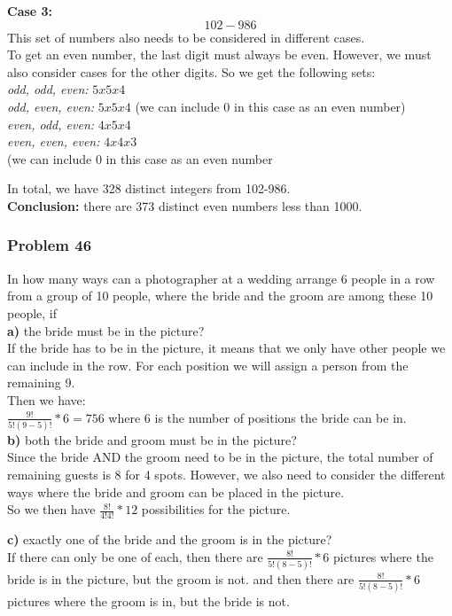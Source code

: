 \documentclass[paper=a4, fontsize=11pt]{scrartcl} %
\begin{document}
\textbf{Case 3:}\\
\[102-986\] This set of numbers also needs to be considered in different cases.\\
To get an even number, the last digit must always be even. However, we must also consider cases for the other digits. So we get the following sets:\\

\textit{odd, odd, even: } $5x5x4$\\
\textit{odd, even, even: } $5x5x4$ (we can include 0 in this case as an even number)\\
\textit{even, odd, even: } $4x5x4$\\
\textit{even, even, even: } $4x4x3$\\(we can include 0 in this case as an even number

In total, we have 328 distinct integers from 102-986.\\
\textbf{Conclusion:} there are 373 distinct even numbers less than 1000.\\
\subsubsection*{Problem 46}
In how many ways can a photographer at a wedding arrange 6 people in a row from a group of 10 people, where the bride and the groom are among these 10 people, if\\
\textbf{a)} the bride must be in the picture?\\
If the bride has to be in the picture, it means that we only have other people we can include in the row. For each position we will assign a person from the remaining 9.\\ 
Then we have:\\ 
$\frac{9!}{5!(9-5)!} * 6 = 756$ where 6 is the number of positions the bride can be in.\\

\textbf{b)} both the bride and groom must be in the picture?\\
Since the bride AND the groom need to be in the picture, the total number of remaining guests is 8 for 4 spots. However, we also need to consider the different ways where the bride and groom can be placed in the picture.\\

So we then have $\frac{8!}{4!4!} * 12$ possibilities for the picture.

\textbf{c)} exactly one of the bride and the groom is in the picture?\\
If there can only be one of each, then there are $\frac{8!}{5!(8-5)!} * 6$ pictures where the bride is in the picture, but the groom is not. and then there are $\frac{8!}{5!(8-5)!} * 6$ pictures where the groom is in, but the bride is not.\\
\end{document}
